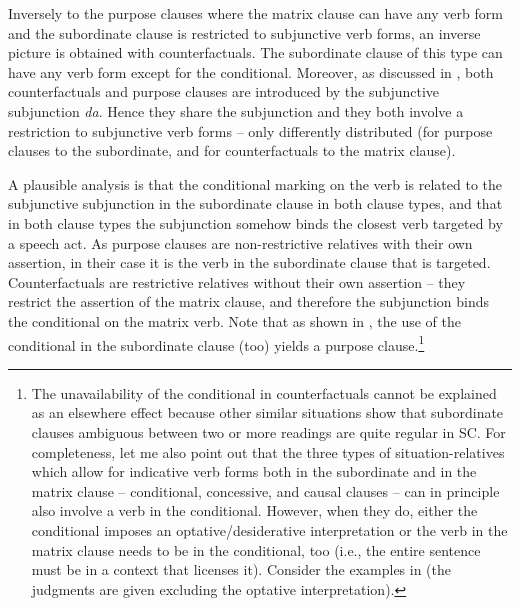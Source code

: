 \documentclass[output=paper]{langscibook}
\begin{document}
\noindent Inversely to the purpose clauses where the matrix clause can have any verb form and the subordinate clause is restricted to subjunctive verb forms, an inverse picture is obtained with counterfactuals. The subordinate clause of this type can have any verb form except for the conditional. Moreover, as discussed in , both counterfactuals and purpose clauses are introduced by the subjunctive subjunction \textit{da}. Hence they share the subjunction and they both involve a restriction to subjunctive verb forms -- only differently distributed (for purpose clauses to the subordinate, and for counterfactuals to the matrix clause).


A plausible analysis is that the conditional marking on the verb is related to the subjunctive subjunction in the subordinate clause in both clause types, and that in both clause types the subjunction somehow binds the closest verb targeted by a speech act. As purpose clauses are non-restrictive relatives with their own assertion, in their case it is the verb in the subordinate clause that is targeted. Counterfactuals are restrictive relatives without their own assertion -- they restrict the assertion of the matrix clause, and therefore the subjunction binds the conditional on the matrix verb. Note that as shown in , the use of the conditional in the subordinate clause (too) yields a purpose clause.\footnote{The unavailability of the conditional in counterfactuals cannot be explained as an elsewhere effect because other similar situations show that subordinate clauses ambiguous between two or more readings are quite regular in SC. For completeness, let me also point out that the three types of situation-relatives which allow for indicative verb forms both in the subordinate and in the matrix clause -- conditional, concessive, and causal clauses -- can in principle also involve a verb in the conditional. However, when they do, either the conditional imposes an optative/desiderative interpretation or the verb in the matrix clause needs to be in the conditional, too (i.e., the entire sentence must be in a context that licenses it). Consider the examples in  (the judgments are given excluding the optative interpretation).

}
\end{document}
